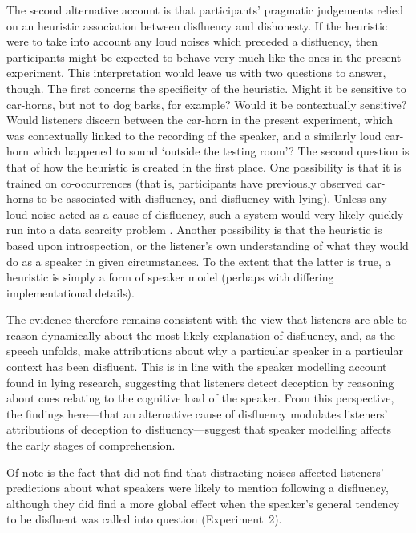 \documentclass[a4paper,man,natbib]{apa6}
\begin{document}
The second alternative account is that participants' pragmatic judgements relied on an heuristic association between disfluency and dishonesty.
If the heuristic were to take into account any loud noises which preceded a disfluency, then participants might be expected to behave very much like the ones in the present experiment.
This interpretation would leave us with two questions to answer, though.
The first concerns the specificity of the heuristic.
Might it be sensitive to car-horns, but not to dog barks, for example?
Would it be contextually sensitive?
Would listeners discern between the car-horn in the present experiment, which was contextually linked to the recording of the speaker, and a similarly loud car-horn which happened to sound `outside the testing room'?
The second question is that of how the heuristic is created in the first place.
One possibility is that it is trained on co-occurrences (that is, participants have previously observed car-horns to be associated with disfluency, and disfluency with lying).
Unless any loud noise acted as a cause of disfluency, such a system would very likely quickly run into a data scarcity problem \citep[see][for a similar argument concerning parsing]{Mitchell:ea:95}.
Another possibility is that the heuristic is based upon introspection, or the listener's own understanding of what they would do as a speaker in given circumstances.
To the extent that the latter is true, a heuristic is simply a form of speaker model (perhaps with differing implementational details).

The evidence therefore remains consistent with the view that listeners are able to reason dynamically about the most likely explanation of disfluency, and, as the speech unfolds, make attributions about why a particular speaker in a particular context has been disfluent.
This is in line with the speaker modelling account found in lying research, suggesting that listeners detect deception by reasoning about cues relating to the cognitive load of the speaker\citep{Zuckerman1981,depaulo2003cues}.
From this perspective, the findings here---that an alternative cause of disfluency modulates listeners' attributions of deception to disfluency---suggest that speaker modelling affects the early stages of comprehension.


Of note is the fact that \citet[][Experiment~3]{Arnold2007} did not find that distracting noises affected listeners' predictions about what speakers were likely to mention following a disfluency, although they did find a more global effect when the speaker's general tendency to be disfluent was called into question (Experiment~2).
\end{document}

